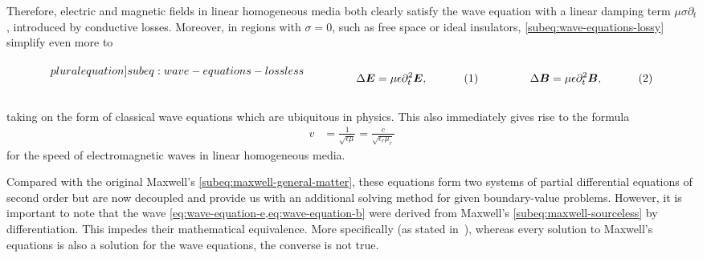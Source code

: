 \documentclass[11pt,a4paper,twoside,openany]{report}
\begin{document}
Therefore, electric and magnetic fields in linear homogeneous media both clearly satisfy the wave equation with a linear damping term $\mu\sigma\partial_t$, introduced by conductive losses. Moreover, in regions with $\sigma = 0$, such as free space or ideal insulators, \cref{subeq:wave-equations-lossy} simplify even more to\\
\begin{subequations}
    \label[pluralequation]{subeq:wave-equations-lossless}
    \noindent\centering
    \begin{minipage}{0.45\textwidth}
        \begin{align}
            \label{eq:wave-equation-e-lossless}
            \Delta\vec E &= \mu\epsilon\partial^2_t\vec E,
        \end{align}
    \end{minipage}
    \hfill
    \begin{minipage}{0.45\textwidth}
        \begin{align}
            \label{eq:wave-equations-b-lossless}
            \Delta\vec B &= \mu\epsilon\partial^2_t\vec B,
        \end{align}
    \end{minipage}\bigskip
\end{subequations}\\
taking on the form of classical wave equations which are ubiquitous in physics. This also immediately gives rise to the formula
\begin{align}
    v &= \frac{1}{\sqrt{\epsilon\mu}} = \frac{c}{\sqrt{\epsilon_r\mu_r}}
\end{align}
for the speed of electromagnetic waves in linear homogeneous media.

\begin{remark}
    \label{remark:nonequivalence-of-wave-equations-with-maxwells-equations}
    Compared with the original Maxwell's \cref{subeq:maxwell-general-matter}, these equations form two systems of partial differential equations of second order but are now decoupled and provide us with an additional solving method for given boundary-value problems. However, it is important to note that the wave \cref{eq:wave-equation-e,eq:wave-equation-b} were derived from Maxwell's \cref{subeq:maxwell-sourceless} by differentiation. This impedes their mathematical equivalence. More specifically (as stated in~\parencite{griffiths:introduction-to-electrodynamics}), whereas every solution to Maxwell's equations is also a solution for the wave equations, the converse is not true.
\end{remark}
\end{document}
